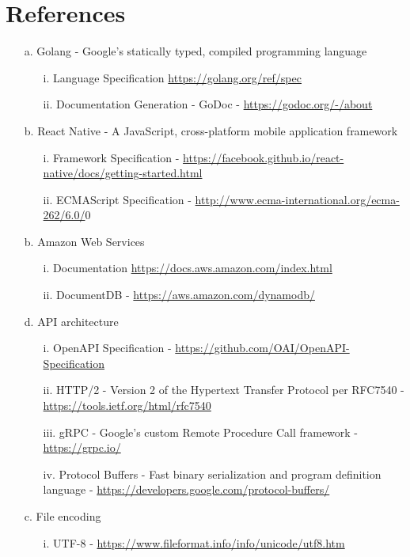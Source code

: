 \documentclass{scrreprt}
\begin{document}
\section{References}
\begin{enumerate}
\item[a.] Golang - Google's statically typed, compiled programming language
	\begin{itemize}
		\item[i.] Language Specification \url{https://golang.org/ref/spec}
		\item[ii.] Documentation Generation - GoDoc - \url{https://godoc.org/-/about}
	\end{itemize}
\item[b.] React Native - A JavaScript, cross-platform mobile application framework 
	\begin{itemize}
		\item[i.] Framework Specification - \url{https://facebook.github.io/react-native/docs/getting-started.html}
		\item[ii.] ECMAScript Specification - \url{http://www.ecma-international.org/ecma-262/6.0/}0
	\end{itemize}
\item[b.] Amazon Web Services
	\begin{itemize}
		\item[i.] Documentation \url{https://docs.aws.amazon.com/index.html}
		\item[ii.] DocumentDB - \url{https://aws.amazon.com/dynamodb/}
	\end{itemize}
\item[d.] API architecture
	\begin{itemize}
		\item[i.] OpenAPI Specification - \url{https://github.com/OAI/OpenAPI-Specification}
		\item[ii.] HTTP/2 - Version 2 of the Hypertext Transfer Protocol per RFC7540 - \url{https://tools.ietf.org/html/rfc7540}
		\item[iii.] gRPC - Google's custom Remote Procedure Call framework - \url{https://grpc.io/}
		\item[iv.] Protocol Buffers - Fast binary serialization and program definition language - \url{https://developers.google.com/protocol-buffers/}
	\end{itemize}
\item[c.] File encoding
	\begin{itemize}
		\item[i.] UTF-8 - \url{https://www.fileformat.info/info/unicode/utf8.htm}
	\end{itemize}
\end{enumerate}
\end{document}
